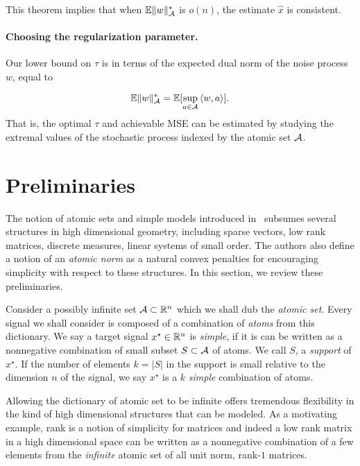 This theorem implies that when $\operatorname{\mathbb{E}} \lVert w\rVert_{\mathcal{A}}^*$ is $o(n)$, the estimate
$\hat{x}$ is consistent.

\paragraph*{Choosing the regularization parameter.} Our lower bound on $\tau$ is
in terms of the expected dual norm of the noise process $w$, equal to

 \[
 	\operatorname{\mathbb{E}} \lVert w\rVert_{\mathcal{A}}^* = \mathbb{E}[\sup_{a\in \mathcal{A}} {\langle w, a\rangle}].
 \]
That is, the optimal $\tau$ and achievable MSE can be estimated
by studying the extremal values of the stochastic process indexed by the atomic
set $\mathcal{A}$.
\\

\section{Preliminaries}

The notion of atomic sets and simple models introduced in~\cite{crpw} subsumes
several structures in high dimensional geometry, including sparse
vectors, low rank matrices, discrete measures, linear systems of small order.
The authors also define a notion of an \emph{atomic norm} as a natural convex
penalties for encouraging simplicity with respect to these structures. In this
section, we review these preliminaries.

Consider a possibly infinite set $\mathcal{A} \subset \mathbb{R}^n$ which we shall dub the
\emph{atomic set}. Every signal we shall consider is composed of a combination
of \emph{atoms} from this dictionary. We say a target signal $x^\star \in \mathbb{R}^n$
is \emph{simple}, if it is can be written as a nonnegative combination of small
subset $S \subset \mathcal{A}$ of atoms. We call $S$, a \emph{support} of $x^\star$. If
the number of elements $k = |S|$ in the support is small relative to the
dimension $n$ of the signal, we say $x^\star$ is a $k$ \emph{simple} combination
of atoms.

Allowing the dictionary of atomic set to be infinite offers tremendous
flexibility in the kind of high dimensional structures that can be modeled. As a
motivating example, rank is a notion of simplicity for matrices and indeed a low
rank matrix in a high dimensional space can be written as a nonnegative
combination of a few elements from the \emph{infinite} atomic set of all unit
norm, rank-$1$ matrices. \\

